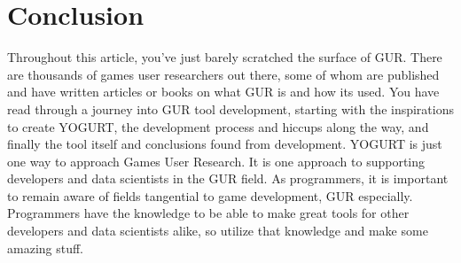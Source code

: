 \documentclass[journal]{IEEEtran}
\begin{document}
%






\section{Conclusion}
Throughout this article, you’ve just barely scratched the surface of GUR. There are thousands of games user researchers out there, some of whom are published and have written articles or books on what GUR is and how its used. You have read through a journey into GUR tool development, starting with the inspirations to create YOGURT, the development process and hiccups along the way, and finally the tool itself and conclusions found from development. YOGURT is just one way to approach Games User Research. It is one approach to supporting developers and data scientists in the GUR field. As programmers, it is important to remain aware of fields tangential to game development, GUR especially. Programmers have the knowledge to be able to make great tools for other developers and data scientists alike, so utilize that knowledge and make some amazing stuff.
\end{document}
